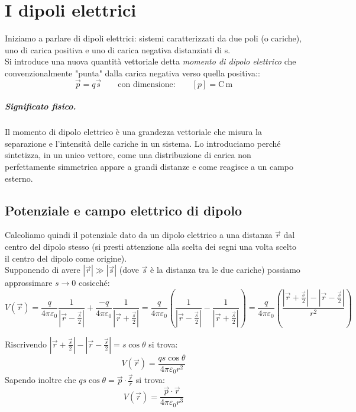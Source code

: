 \documentclass{book}
\begin{document}
\chapter{I dipoli elettrici}

Iniziamo a parlare di dipoli elettrici: sistemi caratterizzati da due poli (o cariche), uno di carica positiva e uno di carica negativa  distanziati di s.\\
Si introduce una nuova quantit\`a vettoriale detta \textit{momento di dipolo elettrico} che convenzionalmente "punta" dalla carica negativa verso quella positiva::
\begin{equation*}
\vec{p}=q\vec{s}\qquad\text{con dimensione:}\qquad [p]=\mathrm{C\,m}
\end{equation*}
 
\paragraph{Significato fisico.} Il momento di dipolo elettrico \`e una grandezza vettoriale che misura la separazione e l'intensit\`a delle cariche in un sistema. Lo introduciamo perch\'e sintetizza, in un unico vettore, come una distribuzione di carica non perfettamente simmetrica appare a grandi distanze e come reagisce a un campo esterno.


\section{Potenziale e campo elettrico di dipolo}
Calcoliamo quindi il potenziale dato da un dipolo elettrico a una distanza $\vec{r}$ dal centro del dipolo stesso (si presti attenzione alla scelta dei segni una volta scelto il centro del dipolo come origine).\\
Supponendo di avere $|\vec{r}|\gg|\vec{s}|$ (dove $\vec{s}$ \`e la distanza tra le due cariche) possiamo approssimare $s \to 0$ cosicch\'e:
\begin{equation*}
V(\vec{r})=\frac{q}{4\pi \varepsilon_0} \frac{1}{\left|\vec{r}-\frac{\vec{s}}{2}\right|}+ \frac{-q}{4\pi \varepsilon_0} \frac{1}{\left|\vec{r}+\frac{\vec{s}}{2}\right|} = \frac{q}{4\pi \varepsilon_0} \left( \frac{1}{\left|\vec{r}-\frac{\vec{s}}{2}\right|}- \frac{1}{\left|\vec{r}+\frac{\vec{s}}{2}\right|} \right) = \frac{q}{4\pi \varepsilon_0} \left( \frac{\left|\vec{r}+\frac{\vec{s}}{2}\right|-\left|\vec{r}-\frac{\vec{s}}{2}\right|}{r^2}  \right)
\end{equation*}

Riscrivendo $\left|\vec{r}+\frac{\vec{s}}{2}\right|-\left|\vec{r}-\frac{\vec{s}}{2}\right| = s\cos\theta$ si trova:
\begin{equation*}
V(\vec{r}) = \frac{qs\cos{\theta}}{4\pi\varepsilon_0r^2}
\end{equation*}
Sapendo inoltre che $qs\cos\theta=\vec{p} \cdot \frac{\vec{r}}{r}$ si trova:
\begin{equation*}
V(\vec{r}) = \frac{\vec{p}\cdot\vec{r}}{4\pi\varepsilon_0r^3}
\end{equation*}
\end{document}

